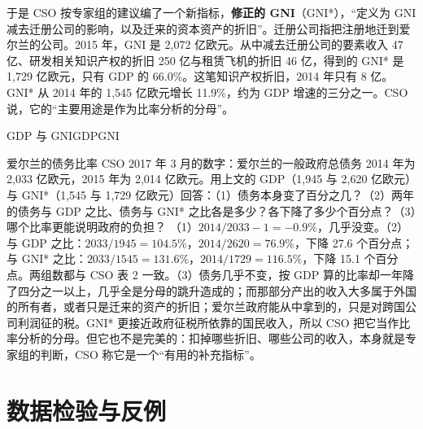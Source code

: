 于是 CSO 按专家组的建议编了一个新指标，\textbf{修正的 GNI}（GNI*），“定义为 GNI 减去迁册公司的影响，以及迁来的资本资产的折旧”\cite{cso2017}。迁册公司指把注册地迁到爱尔兰的公司。2015 年，GNI 是 2,072 亿欧元。从中减去迁册公司的要素收入 47 亿、研发相关知识产权的折旧 250 亿与租赁飞机的折旧 46 亿，得到的 GNI* 是 1,729 亿欧元，只有 GDP 的 66.0\%。这笔知识产权折旧，2014 年只有 8 亿。GNI* 从 2014 年的 1,545 亿欧元增长 11.9\%，约为 GDP 增速的三分之一。CSO 说，它的“主要用途是作为比率分析的分母”\cite{cso2017}。

\begin{compare}{GDP 与 GNI}{GDP}{GNI}
\end{compare}

\begin{example}{爱尔兰的债务比率}\label{ex:accounts-ireland}
CSO 2017 年 3 月的数字：爱尔兰的一般政府总债务 2014 年为 2,033 亿欧元，2015 年为 2,014 亿欧元\cite{cso2017}。用上文的 GDP（1,945 与 2,620 亿欧元）与 GNI*（1,545 与 1,729 亿欧元）回答：（1）债务本身变了百分之几？（2）两年的债务与 GDP 之比、债务与 GNI* 之比各是多少？各下降了多少个百分点？（3）哪个比率更能说明政府的负担？
\solution （1）$2014/2033-1=-0.9\%$，几乎没变。（2）与 GDP 之比：$2033/1945=104.5\%$，$2014/2620=76.9\%$，下降 27.6 个百分点；与 GNI* 之比：$2033/1545=131.6\%$，$2014/1729=116.5\%$，下降 15.1 个百分点。两组数都与 CSO 表 2 一致。（3）债务几乎不变，按 GDP 算的比率却一年降了四分之一以上，几乎全是分母的跳升造成的；而那部分产出的收入大多属于外国的所有者，或者只是迁来的资产的折旧；爱尔兰政府能从中拿到的，只是对跨国公司利润征的税。GNI* 更接近政府征税所依靠的国民收入，所以 CSO 把它当作比率分析的分母。但它也不是完美的：扣掉哪些折旧、哪些公司的收入，本身就是专家组的判断，CSO 称它是一个“有用的补充指标”\cite{cso2017}。
\end{example}

\section{数据检验与反例}\label{sec:accounts-test}

